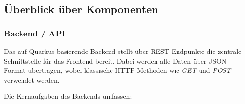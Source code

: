 \subsection{Überblick über Komponenten}
\setauthor{\firstauthor}


\subsubsection{Backend / API}
Das auf Quarkus basierende Backend stellt über REST-Endpunkte die zentrale Schnittstelle für das Frontend bereit. Dabei werden alle Daten
über JSON-Format übertragen, wobei klassische HTTP-Methoden wie \textit{GET} und \textit{POST} verwendet werden.

Die Kernaufgaben des Backends umfassen:

